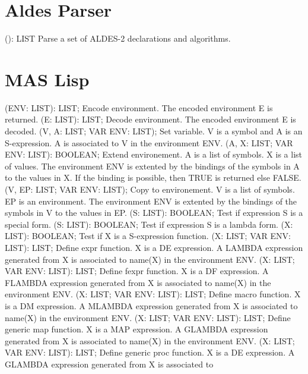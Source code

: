 \section{ Aldes Parser  } 
 (): LIST \eproc
\bcom  Parse a set of ALDES-2 declarations and algorithms.  \ecom 
\section{ MAS Lisp  } 
 (ENV: LIST): LIST; \eproc
\bcom Encode environment. The encoded environment E is returned.  \ecom 
{} (E: LIST): LIST; \eproc
\bcom Decode environment. The encoded environment E is decoded.  \ecom 
{} (V, A: LIST; VAR ENV: LIST); \eproc
\bcom Set variable. V is a symbol and A is an S-expression.
A is associated to V in the environment ENV.  \ecom 
{} (A, X: LIST; VAR ENV: LIST): BOOLEAN; \eproc
\bcom Extend environement. A is a list of symbols. X is a list
of values. The environment ENV is extented by the bindings
of the symbols in A to the values in X. If the binding
is possible, then TRUE is returned else FALSE.  \ecom 
{} (V, EP: LIST; VAR ENV: LIST); \eproc
\bcom Copy to environement. V is a list of symbols. EP is an
environment. The environment ENV is extented by the bindings
of the symbols in V to the values in EP.  \ecom 
{} (S: LIST): BOOLEAN; \eproc
\bcom Test if expression S is a special form.  \ecom 
{} (S: LIST): BOOLEAN; \eproc
\bcom Test if expression S is a lambda form.  \ecom 
{} (X: LIST): BOOLEAN; \eproc
\bcom Test if X is a S-expression function.  \ecom 
{} (X: LIST; VAR ENV: LIST): LIST; \eproc
\bcom Define expr function. X is a DE expression. A LAMBDA expression
generated from X is associated to name(X) in the environment ENV.  \ecom 
{} (X: LIST; VAR ENV: LIST): LIST; \eproc
\bcom Define fexpr function. X is a DF expression. A FLAMBDA expression
generated from X is associated to name(X) in the environment ENV. \ecom 
{} (X: LIST; VAR ENV: LIST): LIST; \eproc
\bcom Define macro function. X is a DM expression. A MLAMBDA expression
generated from X is associated to name(X) in the environment ENV. \ecom 
{} (X: LIST; VAR ENV: LIST): LIST; \eproc
\bcom Define generic map function. X is a MAP expression. A
GLAMBDA expression generated from X is associated to name(X) 
in the environment ENV.  \ecom 
{} (X: LIST; VAR ENV: LIST): LIST; \eproc
\bcom Define generic proc function. X is a DE expression.
A GLAMBDA expression generated from X is associated to 
